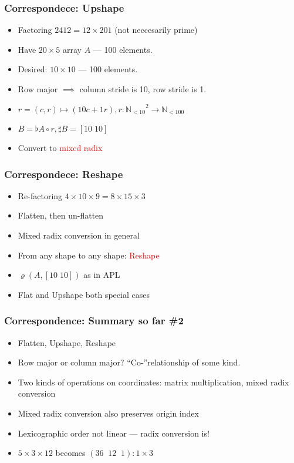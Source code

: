 \documentclass[xetex,mathserif,serif]{beamer}
\newcommand\Nat{\mathbb{N}}
\newcommand\NB[1]{\textcolor{red}{#1}}
\begin{document}
\begin{frame}
  \frametitle{Correspondece: Upshape} 
  \pause
  \begin{itemize}[<+->]
    \item Factoring \(2412 = 12 \times 201\) (not neccesarily prime)
    \item Have \(20\times 5\) array \(A\) --- 100 elements.
    \item Desired: \(10 \times 10\) --- 100 elements.
    \item Row major \(\implies\) column stride is 10, row stride is 1.
    \item \(r = (c, r)\mapsto (10c + 1r), r : {\Nat_{<10}}^2 \to \Nat_{<100}\)
    \item \(B = \flat A \circ r, \sharp B = [10\;10]\)
    \item Convert to \NB{mixed radix}
  \end{itemize}
\end{frame}


\begin{frame}
  \frametitle{Correspondece: Reshape}
  \pause
  \begin{itemize}[<+->]
    \item Re-factoring \(4\times 10 \times 9 = 8 \times 15 \times 3\)
    \item Flatten, then un-flatten
    \item Mixed radix conversion in general
    \item From any shape to any shape: \NB{Reshape}
    \item \(\varrho(A, [10\;10])\) as in APL
    \item Flat and Upshape both special cases
  \end{itemize}
\end{frame}

\begin{frame}
  \frametitle{Correspondence: Summary so far \#2}
  \pause
  \begin{itemize}[<+->]
    \item Flatten, Upshape, Reshape
    \item Row major or column major? ``Co-''relationship of some kind.
    \item Two kinds of operations on coordinates: matrix multiplication, mixed radix conversion
    \item Mixed radix conversion also preserves origin index
    \item Lexicographic order not linear --- radix conversion is!
    \item \(5\times3\times12\) becomes \((36\;\;12\;\;1) : 1 \times 3\)
  \end{itemize}
\end{frame}
\end{document}
